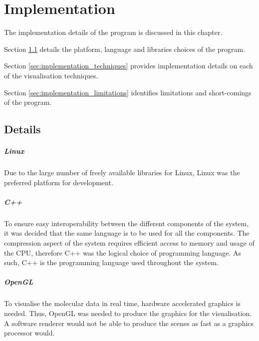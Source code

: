 \graphicspath{{./implementation/}}

\chapter{Implementation}
\label{cha:implementation}

The implementation details of the program is discussed in this chapter.

Section \ref{sec:implementation_details} details the platform, language and
libraries choices of the program.

Section \ref{sec:implementation_techniques} provides implementation details on
each of the visualisation techniques.

Section \ref{sec:implementation_limitations} identifies limitations and
short-comings of the program.

\section{Details}
\label{sec:implementation_details}

\paragraph{Linux}

Due to the large number of freely available libraries for Linux, Linux was the
preferred platform for development.


\paragraph{C++}

To ensure easy interoperability between the different components of the system,
it was decided that the same language is to be used for all the components. The
compression aspect of the system requires efficient access to memory and usage
of the CPU, therefore C++ was the logical choice of programming language. As
such, C++ is the programming language used throughout the system.


\paragraph{OpenGL}

To visualise the molecular data in real time, hardware accelerated graphics is
needed.  Thus, OpenGL \citep{OpenGL} was needed to produce the graphics for the
visualisation. A software renderer would not be able to produce the scenes as
fast as a graphics processor would.


